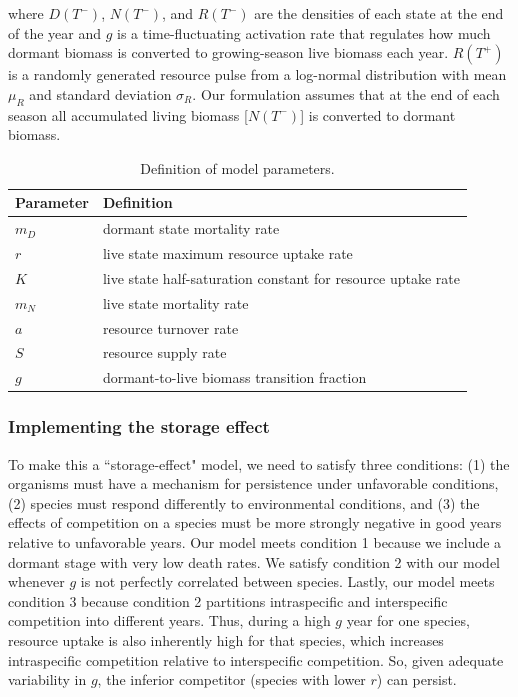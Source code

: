\documentclass[12pt,]{article}
\begin{document}
where $D(T^-)$, $N(T^-)$, and $R(T^-)$ are the densities of each state
at the end of the year and $g$ is a time-fluctuating activation rate
that regulates how much dormant biomass is converted to growing-season
live biomass each year. $R(T^+)$ is a randomly generated resource pulse
from a log-normal distribution with mean $\mu_{R}$ and standard
deviation $\sigma_{R}$. Our formulation assumes that at the end of each
season all accumulated living biomass {[}$N(T^-)${]} is converted to
dormant biomass.

\begin{center}
\begin{table}
\caption{Definition of model parameters.}
\begin{tabular}{l l}
\hline
Parameter & Definition \\
\hline
$m_{D}$ & dormant state mortality rate \\
$r$ & live state maximum resource uptake rate \\
$K$ & live state half-saturation constant for resource uptake rate \\
$m_{N}$ & live state mortality rate \\
$a$ & resource turnover rate \\
$S$ & resource supply rate \\
$g$ & dormant-to-live biomass transition fraction \\ 
\hline
\end{tabular}
\end{table}
\end{center}

\subsubsection{Implementing the storage
effect}\label{implementing-the-storage-effect}

To make this a ``storage-effect" model, we need to satisfy three
conditions: (1) the organisms must have a mechanism for persistence
under unfavorable conditions, (2) species must respond differently to
environmental conditions, and (3) the effects of competition on a
species must be more strongly negative in good years relative to
unfavorable years. Our model meets condition 1 because we include a
dormant stage with very low death rates. We satisfy condition 2 with our
model whenever $g$ is not perfectly correlated between species. Lastly,
our model meets condition 3 because condition 2 partitions intraspecific
and interspecific competition into different years. Thus, during a high
$g$ year for one species, resource uptake is also inherently high for
that species, which increases intraspecific competition relative to
interspecific competition. So, given adequate variability in $g$, the
inferior competitor (species with lower $r$) can persist.
\end{document}
